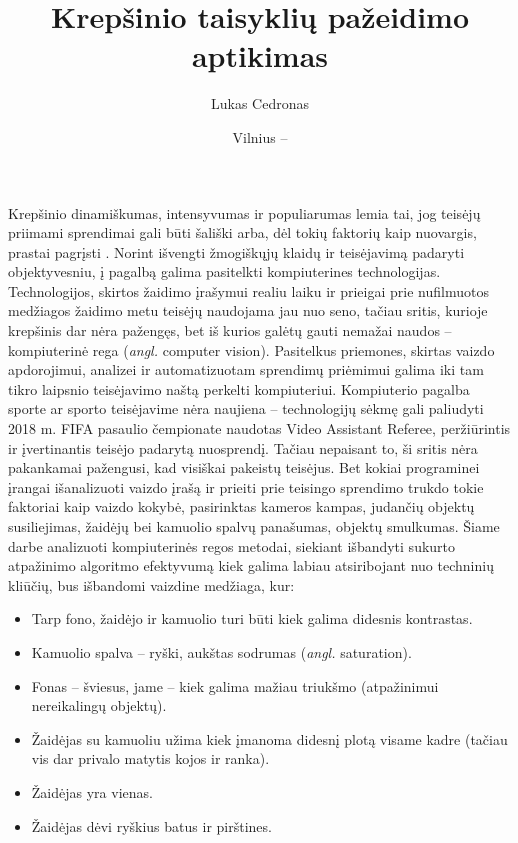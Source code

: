 \documentclass{VUMIFPSkursinis}
\title{Krepšinio taisyklių pažeidimo aptikimas}
\author{Lukas Cedronas}
\date{Vilnius – \the\year}
\begin{document}
\maketitle

\tableofcontents

Krepšinio dinamiškumas, intensyvumas ir populiarumas lemia tai, jog teisėjų priimami sprendimai gali būti šališki \cite{ProfitableBias} arba, dėl tokių faktorių kaip nuovargis, prastai pagrįsti \cite{MissedCalls}. Norint išvengti žmogiškųjų klaidų ir teisėjavimą padaryti objektyvesniu, į pagalbą galima pasitelkti kompiuterines technologijas. Technologijos, skirtos žaidimo įrašymui realiu laiku ir prieigai prie nufilmuotos medžiagos žaidimo metu teisėjų naudojama jau nuo seno, tačiau sritis, kurioje krepšinis dar nėra pažengęs, bet iš kurios galėtų gauti nemažai naudos – kompiuterinė rega (\textit{angl.} computer vision). Pasitelkus priemones, skirtas vaizdo apdorojimui, analizei ir automatizuotam sprendimų priėmimui galima iki tam tikro laipsnio teisėjavimo naštą perkelti kompiuteriui. Kompiuterio pagalba sporte ar sporto teisėjavime nėra naujiena – technologijų sėkmę gali paliudyti  2018 m. FIFA pasaulio čempionate naudotas Video Assistant Referee, peržiūrintis ir įvertinantis teisėjo padarytą nuosprendį. Tačiau nepaisant to, ši sritis nėra pakankamai pažengusi, kad visiškai pakeistų teisėjus. Bet kokiai programinei įrangai išanalizuoti vaizdo įrašą ir prieiti prie teisingo sprendimo trukdo tokie faktoriai kaip vaizdo kokybė, pasirinktas kameros kampas, judančių objektų susiliejimas, žaidėjų bei kamuolio spalvų panašumas, objektų smulkumas. Šiame darbe analizuoti kompiuterinės regos metodai, siekiant išbandyti sukurto atpažinimo algoritmo efektyvumą kiek galima labiau atsiribojant nuo techninių kliūčių, bus išbandomi vaizdine medžiaga, kur:
\begin{itemize}[topsep=5pt,itemsep=-1ex,partopsep=2ex,parsep=2ex]
 \item Tarp fono, žaidėjo ir kamuolio turi būti kiek galima didesnis kontrastas.
 \item Kamuolio spalva – ryški, aukštas sodrumas (\textit{angl.} saturation).
 \item Fonas – šviesus, jame – kiek galima mažiau triukšmo (atpažinimui nereikalingų objektų).
 \item Žaidėjas su kamuoliu užima kiek įmanoma didesnį plotą visame kadre (tačiau vis dar privalo matytis kojos ir ranka).
 \item Žaidėjas yra vienas.
 \item Žaidėjas dėvi ryškius batus ir pirštines.
\end{itemize}
\end{document}
